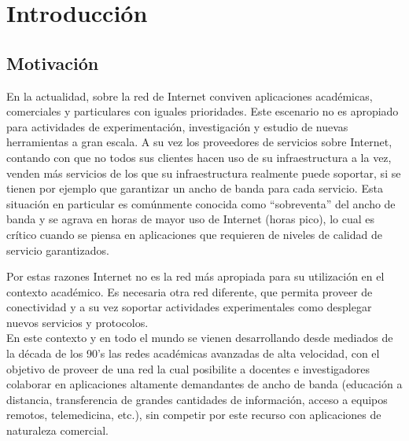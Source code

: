 
\chapter{Introducci\'on}

\ifpdf
    \graphicspath{{Chapter1/Figs/Raster/}{Chapter1/Figs/PDF/}{Chapter2/Figs/}}
\else
    \graphicspath{{Chapter1/Figs/Vector/}{Chapter1/Figs/}}
\fi


\section{Motivación}

En la actualidad, sobre la red de Internet conviven aplicaciones académicas, comerciales y particulares con iguales prioridades. Este escenario no es apropiado para actividades de experimentación, investigación y estudio de nuevas herramientas a gran escala. A su vez los proveedores de servicios sobre Internet, contando con que no todos sus clientes hacen uso de su infraestructura a la vez, venden m\'as servicios de los que su infraestructura realmente puede soportar, si se tienen por ejemplo que garantizar un ancho de banda para cada servicio. Esta situación en particular es comúnmente conocida como “sobreventa” del ancho de banda y se agrava en horas de mayor uso de Internet (horas pico), lo cual es crítico cuando se piensa en aplicaciones que requieren de niveles de calidad de servicio garantizados.

Por estas razones Internet no es la red más apropiada para su utilización en el contexto académico. Es necesaria otra red diferente, que permita proveer de conectividad y a su vez soportar actividades experimentales como desplegar nuevos servicios y protocolos.\\ 

En este contexto y en todo el mundo se vienen desarrollando desde mediados de la década de los 90’s las redes académicas avanzadas de alta velocidad, con el objetivo de proveer de una red la cual posibilite a docentes e investigadores colaborar en aplicaciones altamente demandantes de ancho de banda (educación a distancia, transferencia de grandes cantidades de información, acceso a equipos remotos, telemedicina, etc.), sin competir por este recurso con aplicaciones de naturaleza comercial.

